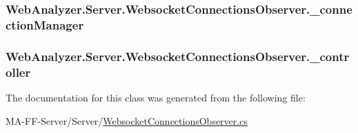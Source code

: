 \subsubsection[{\+\_\+connection\+Manager}]{ Web\+Analyzer.\+Server.\+Websocket\+Connections\+Observer.\+\_\+connection\+Manager\hspace{0.3cm}{\ttfamily [private]}}\label{class_web_analyzer_1_1_server_1_1_websocket_connections_observer_a12deecceed19d790d4f3a07bb121f519}
\hypertarget{class_web_analyzer_1_1_server_1_1_websocket_connections_observer_ac4ce45307e4d81fc6902369aacd6fb0f}{}
\subsubsection[{\+\_\+controller}]{ Web\+Analyzer.\+Server.\+Websocket\+Connections\+Observer.\+\_\+controller\hspace{0.3cm}{\ttfamily [private]}}\label{class_web_analyzer_1_1_server_1_1_websocket_connections_observer_ac4ce45307e4d81fc6902369aacd6fb0f}


The documentation for this class was generated from the following file\+:\begin{DoxyCompactItemize}
\item 
M\+A-\/\+F\+F-\/\+Server/\+Server/\hyperlink{_websocket_connections_observer_8cs}{Websocket\+Connections\+Observer.\+cs}\end{DoxyCompactItemize}
